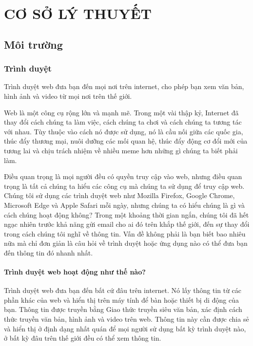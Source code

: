 \documentclass[11pt]{report}
\begin{document}
	\chapter{CƠ SỞ LÝ THUYẾT}
	\fontsize{13px}{13px}\selectfont\justifying
	\section{Môi trường}
	
	\subsection{Trình duyệt \cite{web:browser:what}} \label{subsection:webclient}
	Trình duyệt web đưa bạn đến mọi nơi trên internet, cho phép bạn xem văn bản, hình ảnh và video từ mọi nơi trên thế giới.
	
	Web là một công cụ rộng lớn và mạnh mẽ. Trong một vài thập kỷ, Internet đã thay đổi cách chúng ta làm việc, cách chúng ta chơi và cách chúng ta tương tác với nhau. Tùy thuộc vào cách nó được sử dụng, nó là cầu nối giữa các quốc gia, thúc đẩy thương mại, nuôi dưỡng các mối quan hệ, thúc đẩy động cơ đổi mới của tương lai và chịu trách nhiệm về nhiều meme hơn những gì chúng ta biết phải làm.
	
	Điều quan trọng là mọi người đều có quyền truy cập vào web, nhưng điều quan trọng là tất cả chúng ta hiểu các công cụ mà chúng ta sử dụng để truy cập web. Chúng tôi sử dụng các trình duyệt web như Mozilla Firefox, Google Chrome, Microsoft Edge và Apple Safari mỗi ngày, nhưng chúng ta có hiểu chúng là gì và cách chúng hoạt động không? Trong một khoảng thời gian ngắn, chúng tôi đã hết ngạc nhiên trước khả năng gửi email cho ai đó trên khắp thế giới, đến sự thay đổi trong cách chúng tôi nghĩ về thông tin. Vấn đề không phải là bạn biết bao nhiêu nữa mà chỉ đơn giản là câu hỏi về trình duyệt hoặc ứng dụng nào có thể đưa bạn đến thông tin đó nhanh nhất.
	
	
	\subsubsection{Trình duyệt web hoạt động như thế nào?}
	Trình duyệt web đưa bạn đến bất cứ đâu trên internet. Nó lấy thông tin từ các phần khác của web và hiển thị trên máy tính để bàn hoặc thiết bị di động của bạn. Thông tin được truyền bằng Giao thức truyền siêu văn bản, xác định cách thức truyền văn bản, hình ảnh và video trên web. Thông tin này cần được chia sẻ và hiển thị ở định dạng nhất quán để mọi người sử dụng bất kỳ trình duyệt nào, ở bất kỳ đâu trên thế giới đều có thể xem thông tin.
	
\end{document}
